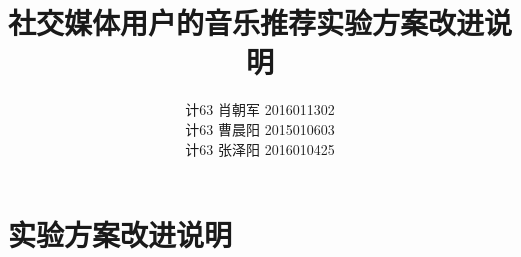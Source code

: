 \documentclass[UTF8,a4paper,10pt]{ctexart}
\title{\textbf{社交媒体用户的音乐推荐实验方案改进说明}}
\author{ 计63 肖朝军 2016011302 \\ 计63 曹晨阳 2015010603 \\ 计63 张泽阳 2016010425} %
\begin{document}
    \maketitle %
        
 

\thispagestyle{empty}


\tableofcontents
\clearpage
%
%
%
%
%
%
%
%
%
%
%
%
%
%
%
%
\section{实验方案改进说明}

%




%
%
\end{document}
